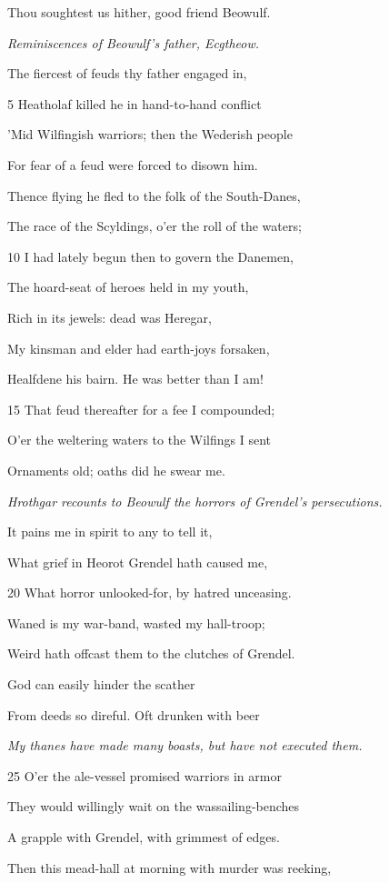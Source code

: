Thou soughtest us hither, good friend Beowulf.

\emph{Reminiscences of
Beowulf’s father,
Ecgtheow.}

The fiercest of feuds thy father engaged in,

5
Heatholaf killed he in hand-to-hand conflict

’Mid Wilfingish warriors; then the Wederish people

For fear of a feud were forced to disown him.

Thence flying he fled to the folk of the South-Danes,

The race of the Scyldings, o’er the roll of the waters;

10
I had lately begun then to govern the Danemen,

The hoard-seat of heroes held in my youth,

Rich in its jewels: dead was Heregar,

My kinsman and elder had earth-joys forsaken,

Healfdene his bairn. He was better than I am!

15
That feud thereafter for a fee I compounded;

O’er the weltering waters to the Wilfings I sent

Ornaments old; oaths did he swear me.

\emph{Hrothgar recounts
to Beowulf the
horrors of Grendel’s
persecutions.}

It pains me in spirit to any to tell it,

What grief in Heorot Grendel hath caused me,

20
What horror unlooked-for, by hatred unceasing.

Waned is my war-band, wasted my hall-troop;

Weird hath offcast them to the clutches of Grendel.

God can easily hinder the scather

From deeds so direful. Oft drunken with beer

\emph{My thanes have
made many boasts,
but have not executed
them.}

25
O’er the ale-vessel promised warriors in armor

They would willingly wait on the wassailing-benches

A grapple with Grendel, with grimmest of edges.

Then this mead-hall at morning with murder was reeking,


